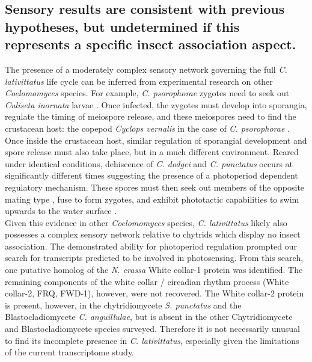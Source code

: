 \subsection*{Sensory results are consistent with previous hypotheses, but undetermined if this represents a specific insect association aspect.}
The presence of a moderately complex sensory network governing the full \textit{C. lativittatus} life cycle can be inferred from experimental research on other \textit{Coelomomyces} species. For example, \textit{C. psorophorae} zygotes need to seek out \textit{Culiseta inornata} larvae \cite{Whisler1975}. Once infected, the zygotes must develop into sporangia, regulate the timing of meiospore release, and these meiospores need to find the crustacean host: the copepod \textit{Cyclops vernalis} in the case of \textit{C. psorophorae} \cite{Whisler1974}. Once inside the crustacean host, similar regulation of sporangial development and spore release must also take place, but in a much different environment. Reared under identical conditions, dehiscence of \textit{C. dodgei} and \textit{C. punctatus} occurs at significantly different times \cite{Federici1983} suggesting the presence of a photoperiod dependent regulatory mechanism. These spores must then seek out members of the opposite mating type \cite{Federici1983}, fuse to form zygotes, and exhibit phototactic capabilities to swim upwards to the water surface \cite{Federici1983}. \\
\indent Given this evidence in other \textit{Coelomomyces} species, \textit{C. lativittatus} likely also possesses a complex sensory network relative to chytrids which display no insect association. The demonstrated ability for photoperiod regulation prompted our search for transcripts predicted to be involved in photosensing. From this search, one putative homolog of the \textit{N. crassa} White collar-1 protein was identified. The remaining components of the white collar / circadian rhythm process (White collar-2, FRQ, FWD-1), however, were not recovered. The White collar-2 protein is present, however, in the chytridiomycete \textit{S. punctatus} and the Blastocladiomycete \textit{C. anguillulae}, but is absent in the other Chytridiomycete and Blastocladiomycete species surveyed. Therefore it is not necessarily unusual to find its incomplete presence in \textit{C. lativittatus}, especially given the limitations of the current transcriptome study. \\
